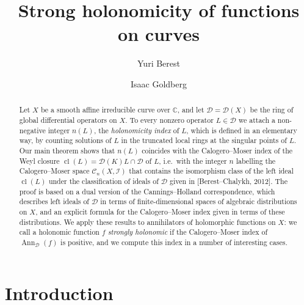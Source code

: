\documentclass[11pt,reqno]{amsart}
\theoremstyle{plain}
\theoremstyle{definition}
\theoremstyle{remark}
\numberwithin{equation}{section}
\newcommand{\cD}{\mathcal{D}}
\newcommand{\cC}{\mathcal{C}}
\newcommand{\C}{\mathbb{C}}
\DeclareMathOperator{\Ann}{Ann}
\DeclareMathOperator{\cl}{cl}
\begin{document}
\title{Strong holonomicity of functions on curves}

\author{Yuri Berest}
\address{Department of Mathematics, Cornell University, Ithaca, NY 14853-4201, USA}

\author{Isaac Goldberg}
\address{Department of Mathematics, Cornell University, Ithaca, NY 14853-4201, USA}


\begin{abstract}
Let $X$ be a smooth affine irreducible curve over $\C$, and let $\cD = \cD(X)$ be the ring of
global differential operators on $X$. To every nonzero operator $L \in \cD$ we attach a
non-negative integer $n(L)$, the \emph{holonomicity index} of $L$, which is defined in an elementary way, by counting solutions of $L$ in the truncated local rings at the singular points of $L$. Our main theorem shows that $n(L)$ coincides with the Calogero--Moser index of the Weyl closure $\cl(L) = \cD(K) L \cap \cD$ of $L$, i.e.\ with the integer $n$ labelling the Calogero--Moser space $\cC_n(X,\mathcal{I})$ that contains the isomorphism class of the left ideal $\cl(L)$
under the classification of ideals of $\cD$ given in [Berest--Chalykh, 2012]. 
The proof is based on a dual version of the Cannings--Holland correspondence, which describes left ideals of $\cD$ in terms of finite-dimensional spaces of algebraic distributions on $X$, and an
explicit formula for the Calogero--Moser index given in terms of these distributions. We apply these results to
annihilators of holomorphic functions on $X$: we call a holonomic function $f$ \emph{strongly holonomic} if the Calogero--Moser index of $\Ann_{\cD}(f)$ is positive, and we compute this index in a number of interesting cases.
\end{abstract}

\maketitle

\section{Introduction}
\label{S1}
\end{document}
